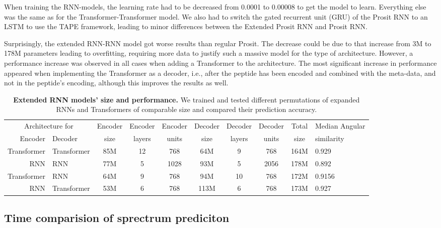\documentclass[10pt,a4paper]{article}
\begin{document}
When training the RNN-models, the learning rate had to be decreased from 0.0001 to 0.00008 to get the model to learn. Everything else was the same as for the Transformer-Transformer model. We also had to switch the gated recurrent unit (GRU) of the Prosit RNN to an LSTM to use the TAPE framework, leading to minor differences between the Extended Prosit RNN and Prosit RNN. 

Surprisingly, the extended RNN-RNN model got worse results than regular Prosit. The decrease could be due to that increase from 3M to 178M parameters leading to overfitting, requiring more data to justify such a massive model for the type of architecture. However, a performance increase was observed in all cases when adding a Transformer to the architecture. The most significant increase in performance appeared when implementing the Transformer as a decoder, i.e., after the peptide has been encoded and combined with the meta-data, and not in the peptide's encoding, although this improves the results as well. 

\begin{table}[htbp]
    \caption{{\bf Extended RNN models' size and performance.} We trained and tested different permutations of expanded RNNs and Transformers of comparable size and compared their prediction accuracy.}
      \begin{tabular}{r@{-}l|cccccccl}
      \hline
      \multicolumn{2}{c|}{Architecture for} & Encoder & Encoder & Encoder & Decoder & Decoder & Decoder & Total & Median Angular \\
      Encoder   & Decoder    & size    & layers & units & size    & layers & units   & size  & similarity \\
      \hline
      Transformer & Transformer & 85M   & 12 & 768 & 64M   & 9 & 768 & 164M  & 0.929 \\
      RNN & RNN & 77M   & 5 & 1028 & 93M   & 5 & 2056 & 178M  & 0.892 \\
      Transformer & RNN & 64M  & 9 & 768 & 94M   & 10 & 768  & 172M  & 0.9156 \\
      RNN & Transformer & 53M   & 6 & 768 & 113M   & 6 & 768  & 173M  & 0.927 \\
      \hline
      \end{tabular}%
    \label{tab:architecture}%
  \end{table}%

\subsection*{Time comparision of sprectrum prediciton}
\end{document}
